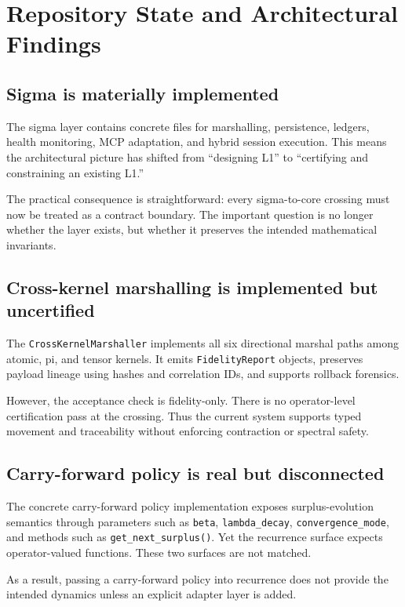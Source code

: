 \documentclass[11pt]{article}
\begin{document}
\section{Repository State and Architectural Findings}

\subsection{Sigma is materially implemented}

The sigma layer contains concrete files for marshalling, persistence, ledgers, health monitoring, MCP adaptation, and hybrid session execution. This means the architectural picture has shifted from ``designing L1'' to ``certifying and constraining an existing L1.''

The practical consequence is straightforward: every sigma-to-core crossing must now be treated as a contract boundary. The important question is no longer whether the layer exists, but whether it preserves the intended mathematical invariants.

\subsection{Cross-kernel marshalling is implemented but uncertified}

The \texttt{CrossKernelMarshaller} implements all six directional marshal paths among atomic, pi, and tensor kernels. It emits \texttt{FidelityReport} objects, preserves payload lineage using hashes and correlation IDs, and supports rollback forensics.

However, the acceptance check is fidelity-only. There is no operator-level certification pass at the crossing. Thus the current system supports typed movement and traceability without enforcing contraction or spectral safety.

\subsection{Carry-forward policy is real but disconnected}

The concrete carry-forward policy implementation exposes surplus-evolution semantics through parameters such as \texttt{beta}, \texttt{lambda\_decay}, \texttt{convergence\_mode}, and methods such as \texttt{get\_next\_surplus()}. Yet the recurrence surface expects operator-valued functions. These two surfaces are not matched.

As a result, passing a carry-forward policy into recurrence does not provide the intended dynamics unless an explicit adapter layer is added.
\end{document}
